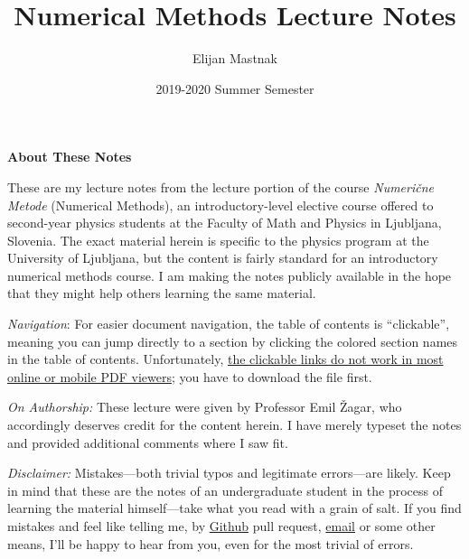\documentclass[11pt, a4paper]{article}
\begin{document}
\title{Numerical Methods Lecture Notes}
\author{Elijan Mastnak}
\date{2019-2020 Summer Semester}
\maketitle

\begin{center}
\textbf{About These Notes}
\end{center}
These are my lecture notes from the lecture portion of the course \textit{Numeri\v{c}ne Metode} (Numerical Methods), an introductory-level elective course offered to second-year physics students at the Faculty of Math and Physics in Ljubljana, Slovenia. The exact material herein is specific to the physics program at the University of Ljubljana, but the content is fairly standard for an introductory numerical methods course. I am making the notes publicly available in the hope that they might help others learning the same material.

\vspace{2mm}
\textit{Navigation}: For easier document navigation, the table of contents is ``clickable'', meaning you can jump directly to a section by clicking the colored section names in the table of contents. Unfortunately, \uline{the clickable links do not work in most online or mobile PDF viewers}; you have to download the file first.

\vspace{2mm}
\textit{On Authorship:} These lecture were given by Professor Emil \v{Z}agar, who accordingly deserves credit for the content herein. I have merely typeset the notes and provided additional comments where I saw fit.


\vspace{2mm}
\textit{Disclaimer:} Mistakes---both trivial typos and legitimate errors---are likely. Keep in mind that these are the notes of an undergraduate student in the process of learning the material himself---take what you read with a grain of salt. If you find mistakes and feel like telling me, by \href{https://github.com/ejmastnak/fmf}{Github} pull request, \href{mailto:ejmastnak@gmail.com}{email} or some other means, I'll be happy to hear from you, even for the most trivial of errors.


\tableofcontents

\newpage
\end{document}
